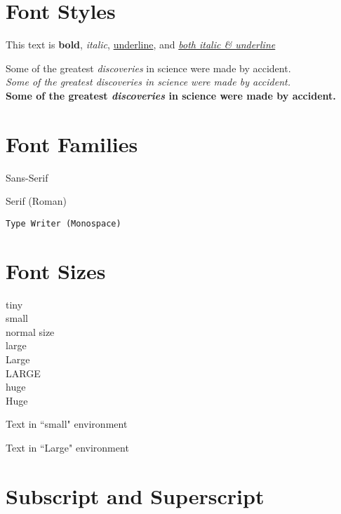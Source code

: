 \documentclass{article}
\begin{document}
\section{Font Styles}

This text is \textbf{bold},
\textit{italic},
\underline{underline}, and
\textit{\underline{both italic \& underline}}

Some of the greatest \emph{discoveries} in science
were made by accident.\\
\textit{Some of the greatest \emph{discoveries}
in science were made by accident.}\\
\textbf{Some of the greatest \emph{discoveries}
in science were made by accident.}



\section{Font Families}

\textsf{Sans-Serif}

\textrm{Serif (Roman)}

\texttt{Type Writer (Monospace)}



\section{Font Sizes}

{\tiny tiny}\\
{\small small}\\
{\normalsize normal size}\\
{\large large}\\
{\Large Large}\\
{\LARGE LARGE}\\
{\huge huge}\\
{\Huge Huge}

\begin{small}
    Text in ``small" environment
\end{small}

\begin{Large}
    Text in ``Large" environment
\end{Large}



\section{Subscript and Superscript}
\end{document}
